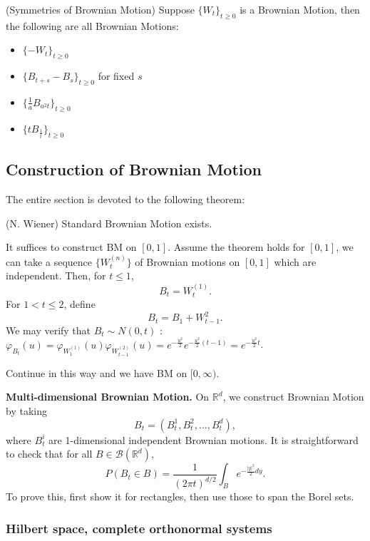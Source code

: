 \begin{proposition}(Symmetries of Brownian Motion)
	Suppose $\{W_t\} _{t \ge 0}$ is a Brownian Motion, then the following are all Brownian Motions:
	\begin{itemize}
		\item $\{- W_t\} _{t \ge 0}$
		\item $\{B_{t + s} - B_s\} _{t \ge 0}$ for fixed $s$
		\item  $\{\frac{1}{a} B_{a^2 t}\} _{t \ge 0}$
		\item $\{t B _{\frac{1}{t}}\} _{t \ge 0}$ 
	\end{itemize}
\end{proposition}


\subsection{Construction of Brownian Motion}

The entire section is devoted to the following theorem:

\begin{theorem}(N. Wiener) 
	Standard Brownian Motion exists.
\end{theorem}

It suffices to construct BM on $[0,1]$. Assume the theorem holds for $[0,1]$, we can take a sequence $\{W_t^{(n)}\}$ of Brownian motions on $[0,1]$ which are independent. Then, for $t \le 1$,
 \[
	B_t = W_t^{(1)}
.\] 
For $1 < t \le 2$, define
\[
	B_t = B_1 + W_{t - 1}^{2}
.\] 
We may verify that $B_t \sim N(0,t)$ : $\varphi_{B_t}(u) = \varphi_{W_1^{(1)}}(u) \varphi_{W_{t - 1}^{(2)}}(u) = e^{- \frac{u^2}{2}} e^{- \frac{u^2}{2}(t - 1)} = e^{- \frac{u^2}{2}t}$.

Continue in this way and we have BM on $[0,\infty )$.

\textbf{Multi-dimensional Brownian Motion.}
On $\mathbb{R}^d$, we construct Brownian Motion by taking
\[
	B_t = \left( B_t^1, B_t^2, \ldots, B_t^d \right) 
,\] 
where $B_t^i$ are 1-dimensional independent Brownian motions. It is straightforward to check that for all $B \in \mathcal{B}(\mathbb{R}^d)$,
\[
	P(B_t \in B) = 
	\frac{1}{\left( 2 \pi t \right) ^{d / 2}}
	\int _B e^{- \frac{|y|^2}{2}d y}
.\] 
To prove this, first show it for rectangles, then use those to span the Borel sets.


\subsubsection{Hilbert space, complete orthonormal systems}

